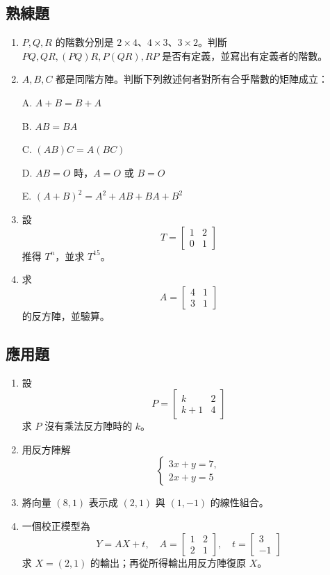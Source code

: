 \documentclass[11pt,a4paper]{article}
\begin{document}
\subsection{熟練題}\label{ux719fux7df4ux984c}

\begin{enumerate}
\def\labelenumi{\arabic{enumi}.}
\setcounter{enumi}{4}
\item
  \(P,Q,R\) 的階數分別是 \(2\times4\)、\(4\times3\)、\(3\times2\)。判斷 \(PQ,QR,(PQ)R,P(QR),RP\) 是否有定義，並寫出有定義者的階數。
\item
  \(A,B,C\) 都是同階方陣。判斷下列敘述何者對所有合乎階數的矩陣成立：

  A. \(A+B=B+A\)

  B. \(AB=BA\)

  C. \((AB)C=A(BC)\)

  D. \(AB=O\) 時，\(A=O\) 或 \(B=O\)

  E. \((A+B)^2=A^2+AB+BA+B^2\)
\item
  設
  \[T=\begin{bmatrix}1&2\\0&1\end{bmatrix}\]
  推得 \(T^n\)，並求 \(T^{15}\)。
\item
  求
  \[A=\begin{bmatrix}4&1\\3&1\end{bmatrix}\]
  的反方陣，並驗算。
\end{enumerate}

\subsection{應用題}\label{ux61c9ux7528ux984c}

\begin{enumerate}
\def\labelenumi{\arabic{enumi}.}
\setcounter{enumi}{8}
\item
  設
  \[P=\begin{bmatrix}k&2\\k+1&4\end{bmatrix}\]
  求 \(P\) 沒有乘法反方陣時的 \(k\)。
\item
  用反方陣解
  \[
  \begin{cases}
  3x+y=7,\\
  2x+y=5
  \end{cases}
  \]
\item
  將向量 \((8,1)\) 表示成 \((2,1)\) 與 \((1,-1)\) 的線性組合。
\item
  一個校正模型為
  \[
  Y=AX+t,
  \quad
  A=\begin{bmatrix}1&2\\2&1\end{bmatrix},
  \quad
  t=\begin{bmatrix}3\\-1\end{bmatrix}
  \]
  求 \(X=(2,1)\) 的輸出；再從所得輸出用反方陣復原 \(X\)。
\end{enumerate}
\end{document}
